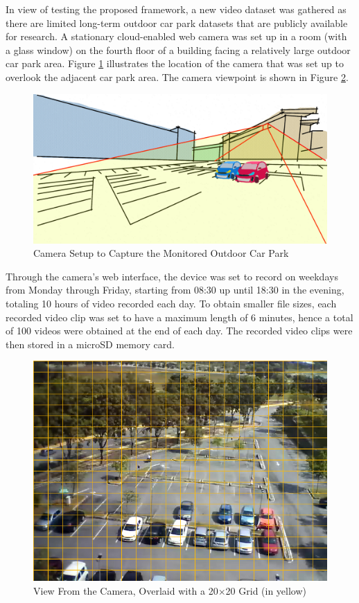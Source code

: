 In view of testing the proposed framework, a new video dataset was gathered as there are limited long-term outdoor car park datasets that are publicly available for research. A stationary cloud-enabled web camera was set up in a room (with a glass window) on the fourth floor of a building facing a relatively large outdoor car park area. Figure \ref{fig:camerasetup} illustrates the location of the camera that was set up to overlook the adjacent car park area. The camera viewpoint is shown in Figure \ref{fig:viewfromcamera}.
\begin{figure}[hbt!]\centering
\includegraphics[width=.8\textwidth]{image/new/fcicarpark2.png}
\caption{Camera Setup to Capture the Monitored Outdoor Car Park}
\label{fig:camerasetup}
\end{figure}
Through the camera's web interface, the device was set to record on weekdays from Monday through Friday, starting from 08:30 up until 18:30 in the evening, totaling 10 hours of video recorded each day. To obtain smaller file sizes, each recorded video clip was set to have a maximum length of 6 minutes, hence a total of 100 videos were obtained at the end of each day. The recorded video clips were then stored in a microSD memory card.
\begin{figure}[!hbt]\centering
\includegraphics[width=.7\textwidth]{image/general/grids.png}
\caption{View From the Camera, Overlaid with a 20$\times$20 Grid (in yellow)}
\label{fig:viewfromcamera}
\end{figure}

